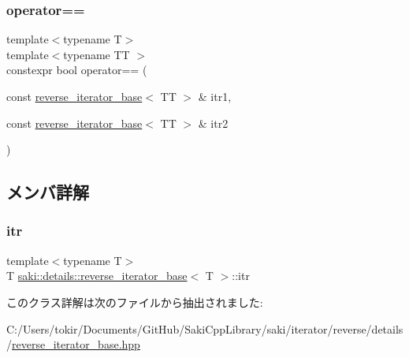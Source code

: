 \subsubsection{\texorpdfstring{operator==}{operator==}}
{\footnotesize\ttfamily template$<$typename T$>$ \\
template$<$typename TT $>$ \\
constexpr bool operator== (\begin{DoxyParamCaption}\item[{const \mbox{\hyperlink{classsaki_1_1details_1_1reverse__iterator__base}{reverse\+\_\+iterator\+\_\+base}}$<$ TT $>$ \&}]{itr1,  }\item[{const \mbox{\hyperlink{classsaki_1_1details_1_1reverse__iterator__base}{reverse\+\_\+iterator\+\_\+base}}$<$ TT $>$ \&}]{itr2 }\end{DoxyParamCaption})\hspace{0.3cm}{\ttfamily [friend]}}



\subsection{メンバ詳解}
\mbox{\label{classsaki_1_1details_1_1reverse__iterator__base_a02df09641bd727c19566dca6c219f279}} 
\subsubsection{\texorpdfstring{itr}{itr}}
{\footnotesize\ttfamily template$<$typename T$>$ \\
T \mbox{\hyperlink{classsaki_1_1details_1_1reverse__iterator__base}{saki\+::details\+::reverse\+\_\+iterator\+\_\+base}}$<$ T $>$\+::itr\hspace{0.3cm}{\ttfamily [protected]}}



このクラス詳解は次のファイルから抽出されました\+:\begin{DoxyCompactItemize}
\item 
C\+:/\+Users/tokir/\+Documents/\+Git\+Hub/\+Saki\+Cpp\+Library/saki/iterator/reverse/details/\mbox{\hyperlink{reverse__iterator__base_8hpp}{reverse\+\_\+iterator\+\_\+base.\+hpp}}\end{DoxyCompactItemize}
